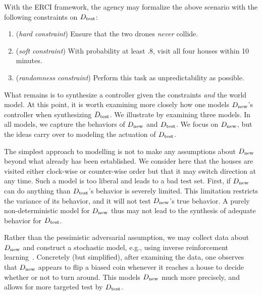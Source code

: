 With the ERCI framework, the agency may formalize the above scenario with the
following constraints on ${D_{\text{test}}}$:
\begin{enumerate}
\item (\emph{hard constraint}) Ensure that the two drones \emph{never} collide.
\item (\emph{soft constraint}) With probability at least $.8$, visit all four houses within 10 minutes.
\item (\emph{randomness constraint}) Perform this task as unpredictability as possible.
\end{enumerate}
What  remains is to synthesize a controller given the constraints
\emph{and} the world model. At this point, it is worth examining more
closely how one models ${D_{\text{new}}}$'s controller when synthesizing
${D_{\text{test}}}$. We illustrate by examining three models. In all models, we capture the behaviors of ${D_{\text{new}}}$ and ${D_{\text{test}}}$. We focus on ${D_{\text{new}}}$, but the ideas carry over to modeling the actuation of ${D_{\text{test}}}$.
%

The simplest approach to modelling is not to make any assumptions about  ${D_{\text{new}}}$ beyond what already has been established. We consider here that the houses are visited either clock-wise or counter-wise order but that it may switch direction at any time. 
Such a model is too liberal and leads to a bad test set.
First, if ${D_{\text{new}}}$ can do anything than ${D_{\text{test}}}$'s behavior is severely limited. This limitation restricts the variance of its behavior, and it will not test ${D_{\text{new}}}$'s true behavior. 
A purely non-deterministic model for ${D_{\text{new}}}$ thus may not lead to the synthesis of adequate behavior for ${D_{\text{test}}}$. 

Rather than the pessimistic adversarial assumption, we may collect data about ${D_{\text{new}}}$ and construct a stochastic model, e.g., using inverse reinforcement learning~\cite{}.
Concretely (but simplified), after examining the data, one observes that ${D_{\text{new}}}$ appears
to flip a biased coin whenever it reaches a house to decide whether or
not to turn around. 
This models ${D_{\text{new}}}$ much more precisely, and allows for more targeted test by ${D_{\text{test}}}$.

